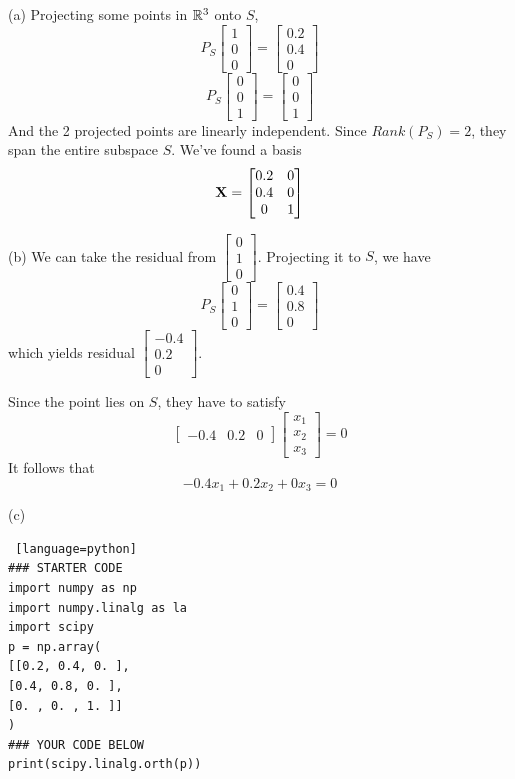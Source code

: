 \documentclass[a4paper, 12pt]{article}
\begin{document}
\begin{problem} [Problem 4]
\end{problem}
\begin{solution}
(a) Projecting some points in $\mathbb{R}^3$ onto $S$,  
\[
P_S \begin{bmatrix}
1 \\ 0 \\ 0
\end{bmatrix} = \begin{bmatrix}
0.2 \\
0.4 \\
0
\end{bmatrix}
\]
\[
P_S \begin{bmatrix}
0 \\ 0 \\ 1
\end{bmatrix} = \begin{bmatrix}
    0 \\ 0 \\ 1
\end{bmatrix}
\]
And the 2 projected points are linearly independent. Since $Rank(P_S) = 2$, they span the entire subspace $S$. We've found a basis \[
\mathbf{X} = \begin{bmatrix}
0.2 & 0 \\
0.4& 0 \\
0 & 1
\end{bmatrix}
\]

(b)
We can take the residual from $\begin{bmatrix}
    0  \\ 1 \\ 0
\end{bmatrix}$. Projecting it to $S$, we have \[
P_S \begin{bmatrix}
0 \\ 1 \\ 0
\end{bmatrix} = \begin{bmatrix}
0.4 \\
0.8 \\
0
\end{bmatrix}
\]
which yields residual $\begin{bmatrix}
-0.4 \\
0.2 \\
0
\end{bmatrix}$.

Since the point lies on $S$, they have to satisfy \[
\begin{bmatrix}
-0.4 & 0.2 & 0
\end{bmatrix}
\begin{bmatrix}
x_1 \\ x_2 \\ x_3
\end{bmatrix} = 0
\]
It follows that \[
-0.4x_1 + 0.2x_2 + 0x_3 = 0
\]

(c)
\begin{lstlisting} [language=python]
### STARTER CODE
import numpy as np
import numpy.linalg as la
import scipy
p = np.array(
[[0.2, 0.4, 0. ],
[0.4, 0.8, 0. ],
[0. , 0. , 1. ]]
)
### YOUR CODE BELOW
print(scipy.linalg.orth(p))
\end{lstlisting}
\end{solution}
\end{document}
